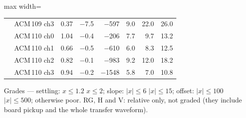 \begin{table}[H]
\begin{adjustbox}{max width=\linewidth}
\begin{tabular}{llrrrrrr}
 & ACM\,109 ch3 & \cellcolor{good}0.37 & \cellcolor{fair}$-$7.5 & \cellcolor{poor}$-$597 & 9.0 & 22.0 & 26.0\\
 & ACM\,110 ch0 & \cellcolor{good}1.04 & \cellcolor{good}$-$0.4 & \cellcolor{fair}$-$206 & 7.7 & 9.7 & 13.2\\
 & ACM\,110 ch1 & \cellcolor{good}0.66 & \cellcolor{good}$-$0.5 & \cellcolor{poor}$-$610 & 6.0 & 8.3 & 12.5\\
 & ACM\,110 ch2 & \cellcolor{good}0.82 & \cellcolor{good}$-$0.1 & \cellcolor{poor}$-$983 & 9.2 & 12.0 & 18.2\\
 & ACM\,110 ch3 & \cellcolor{good}0.94 & \cellcolor{good}$-$0.2 & \cellcolor{poor}$-$1548 & 5.8 & 7.0 & 10.8\\
\bottomrule\end{tabular}\end{adjustbox}
\par\smallskip\footnotesize Grades --- settling: \colorbox{good}{$x\le1.2$} \colorbox{fair}{$x\le2$}; slope: \colorbox{good}{$|x|\le6$} \colorbox{fair}{$|x|\le15$}; offset: \colorbox{good}{$|x|\le100$} \colorbox{fair}{$|x|\le500$}; otherwise \colorbox{poor}{poor}. RG, H and V: relative only, not graded (they include board pickup and the whole transfer waveform).
\end{table}
